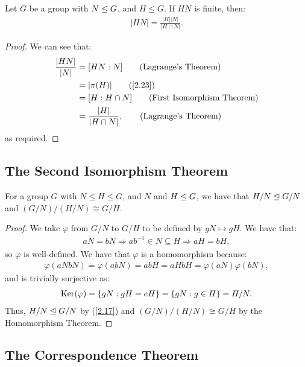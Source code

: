 Let $G$ be a group with $N \trianglelefteq G$, and $H \leq G$.
If $HN$ is finite, then: \begin{align*}
    |HN| = \frac{|H||N|}{|H \cap N|}.
\end{align*}

\begin{proof}
    We can see that: \begin{align*}
        \frac{|HN|}{|N|} 
        &= [HN : N] \tag{Lagrange's Theorem} \\
        &= |\pi(H)| \tag{\ref{2.23}} \\
        &= [H : H \cap N] \tag{First Isomorphism Theorem} \\
        &= \frac{|H|}{|H \cap N|}, \tag{Lagrange's Theorem}
    \end{align*} as required.
\end{proof}

\subsection{The Second Isomorphism Theorem}

For a group $G$ with $N \leq H \leq G$, and $N$ and $H \trianglelefteq G$, we have
that $H / N \trianglelefteq G / N$ and $(G / N) / (H / N) \cong G / H$.

\begin{proof}
    We take $\varphi$ from $G / N$ to $G / H$ to be defined by $gN \mapsto gH$.
    We have that: \begin{align*}
        aN = bN \Longrightarrow ab^{-1} \in N \subseteq H \Longrightarrow aH = bH,
    \end{align*} so $\varphi$ is well-defined. We have that $\varphi$ is a homomorphism
    because: \begin{align*}
        \varphi(aNbN)
        = \varphi(abN)
        = abH
        = aHbH
        = \varphi(aN)\varphi(bN),
    \end{align*} and is trivially surjective as: \begin{align*}
        \operatorname{Ker}(\varphi) 
        = \{gN : gH = eH\}
        = \{gN : g \in H\}
        = H/N.
    \end{align*} Thus, $H / N \trianglelefteq G / N$ by (\ref{2.17}) and
    $(G / N)/(H / N) \cong G / H$ by the Homomorphism Theorem.
\end{proof}

\newpage

\subsection{The Correspondence Theorem}

